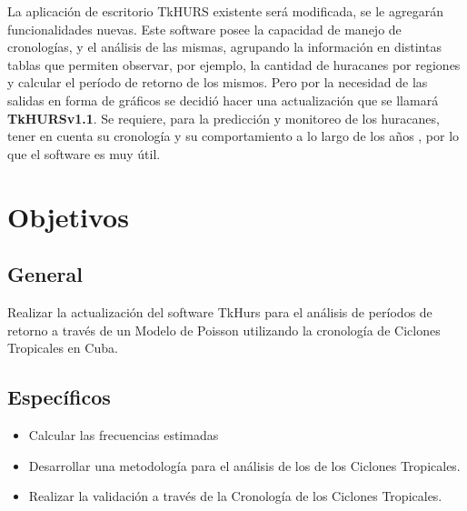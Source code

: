\begin{introduction}
\begin{table}
\begin{center}
\label{escala_saffir_simpson}
\end{center}
\end{table}


La aplicación de escritorio TkHURS existente será modificada, se le agregarán funcionalidades nuevas. Este software  posee la capacidad de manejo de cronologías, y el análisis de las mismas, agrupando la información en distintas tablas que permiten observar, por ejemplo, la cantidad de huracanes por regiones y calcular el período de retorno de los mismos. Pero por la necesidad de las salidas en forma de gráficos se decidió hacer una actualización que se llamará \textbf{TkHURSv1.1}. Se requiere, para la predicción y monitoreo de los huracanes, tener en cuenta su cronología y su comportamiento a lo largo de los años \cite{DK6}, por lo que el software es muy útil.

\section*{Objetivos}

\subsection*{General}
Realizar la actualización del software TkHurs para el análisis de períodos de retorno a través de un Modelo de Poisson utilizando la cronología de Ciclones Tropicales en Cuba.

\subsection*{Específicos}
\begin{itemize}
\item Calcular las frecuencias estimadas
\item Desarrollar una metodología para el análisis de los de los Ciclones Tropicales. 
\item Realizar la validación a través de la Cronología de los Ciclones Tropicales.
\end{itemize}



\end{introduction}
